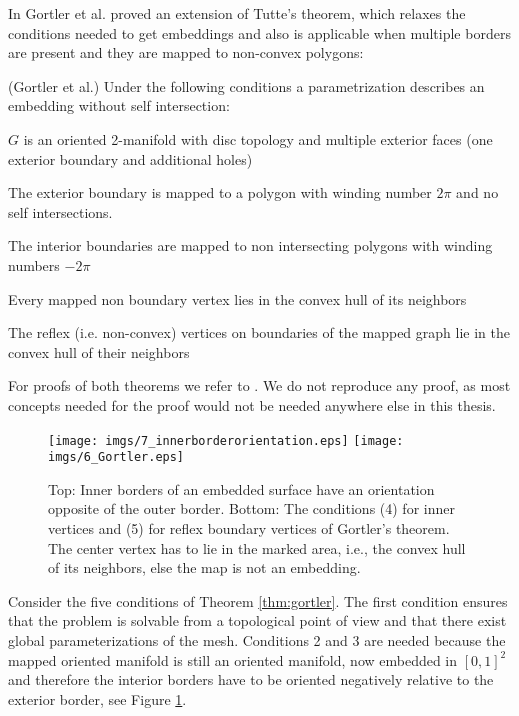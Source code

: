 In \cite{Gortler} Gortler et al. proved an extension of Tutte's theorem, which relaxes the conditions needed to get embeddings and also is applicable when multiple borders are present and they are mapped to non-convex polygons:

\begin{thm}\label{thm:gortler}(Gortler et al.) Under the following conditions a parametrization describes an embedding without self intersection:
\begin{packed_enum}
\item $G$ is an oriented 2-manifold with disc topology and multiple exterior faces (one exterior boundary and additional holes)
\item The exterior boundary is mapped to a polygon with winding number $2\pi$ and no self intersections.
\item The interior boundaries are mapped to non intersecting polygons with winding numbers $-2\pi$
\item Every mapped non boundary vertex lies in the convex hull of its neighbors
\item The reflex (i.e. non-convex) vertices on boundaries of the mapped graph lie in the convex hull of their neighbors
\end{packed_enum}
\end{thm}
For proofs of both theorems we refer to \cite{Gortler}. We do not reproduce any proof, as most concepts needed for the proof would not be needed anywhere else in this thesis.


\begin{figure}%
\begin{center}
\texttt{[image: imgs/7\_innerborderorientation.eps]}%
\vspace{0.5cm}
\texttt{[image: imgs/6\_Gortler.eps]}%
\end{center}

\caption{Top: Inner borders of an embedded surface have an orientation opposite of the outer border. Bottom: The conditions (4) for inner vertices and (5) for reflex boundary vertices of Gortler's theorem. The center vertex has to lie in the marked area, i.e., the convex hull of its neighbors, else the map is not an embedding.}%
\label{fig:7_gortler}%
\end{figure}

Consider the five conditions of Theorem \ref{thm:gortler}. The first condition ensures that the problem is solvable from a topological point of view and that there exist global parameterizations of the mesh. Conditions 2 and 3 are needed because the mapped oriented manifold is still an oriented manifold, now embedded in $[0,1]^2$ and therefore the interior borders  have to be oriented negatively relative to the exterior border, see Figure \ref{fig:7_gortler}. 

